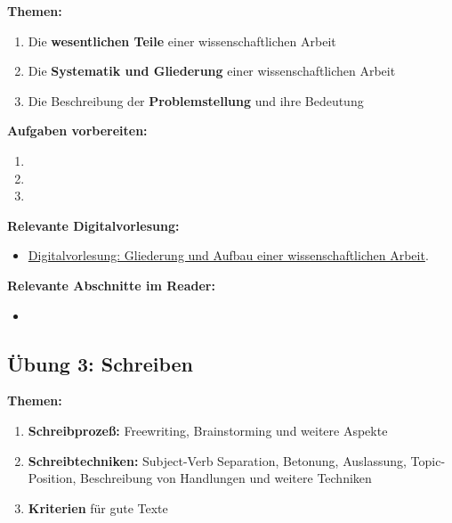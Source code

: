 \documentclass[a4paper]{article}%
\begin{document}
\textbf{Themen:}
\begin{enumerate}
\item Die \textbf{wesentlichen Teile} einer wissenschaftlichen Arbeit
\item Die \textbf{Systematik und Gliederung} einer wissenschaftlichen Arbeit
\item Die Beschreibung der \textbf{Problemstellung} und ihre Bedeutung
\end{enumerate}

\bigskip

\textbf{Aufgaben vorbereiten:}
\begin{enumerate}
\item {}
\item {}
\item {}
\end{enumerate}

\bigskip

\textbf{Relevante Digitalvorlesung:}
\begin{itemize}
\item \hyperlink{Digitalvorlesung}{Digitalvorlesung: Gliederung und Aufbau einer wissenschaftlichen Arbeit}.
\end{itemize}

\bigskip

\textbf{Relevante Abschnitte im Reader:}
\begin{itemize}
\item {}
\end{itemize}


\clearpage
\subsection{Übung 3: Schreiben}


\textbf{Themen:}
\begin{enumerate}
\item \textbf{Schreibprozeß:} Freewriting, Brainstorming und weitere Aspekte
\item \textbf{Schreibtechniken:} Subject-Verb Separation, Betonung, Auslassung, Topic-Position,
 Beschreibung von Handlungen und weitere Techniken
\item \textbf{Kriterien} für gute Texte
\end{enumerate}

\bigskip
\end{document}
